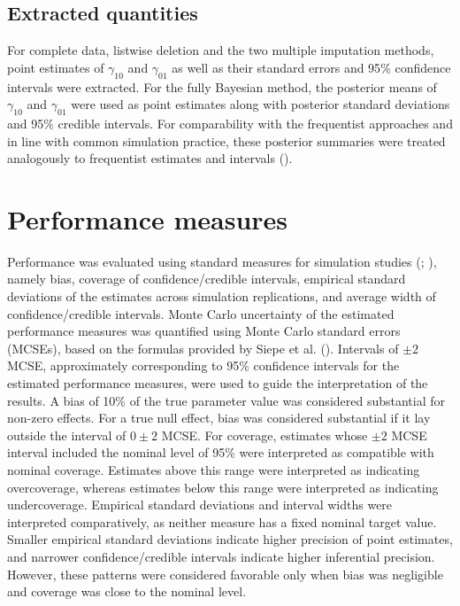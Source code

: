 \documentclass[
  letterpaper,
  11pt,
  english,
  singlespacing,
  headsepline,
  openany]{MastersDoctoralThesis}
\begin{document}
\subsection{Extracted quantities}\label{extracted-quantities}

For complete data, listwise deletion and the two multiple imputation
methods, point estimates of \(\gamma_{10}\) and \(\gamma_{01}\) as well
as their standard errors and 95\(\%\) confidence intervals were
extracted. For the fully Bayesian method, the posterior means of
\(\gamma_{10}\) and \(\gamma_{01}\) were used as point estimates along
with posterior standard deviations and 95\(\%\) credible intervals. For
comparability with the frequentist approaches and in line with common
simulation practice, these posterior summaries were treated analogously
to frequentist estimates and intervals ().

\section{Performance measures}\label{performance-measures}

Performance was evaluated using standard measures for simulation studies
(; ), namely bias, coverage of confidence/credible intervals,
empirical standard deviations of the estimates across simulation
replications, and average width of confidence/credible intervals. Monte
Carlo uncertainty of the estimated performance measures was quantified
using Monte Carlo standard errors (MCSEs), based on the formulas
provided by Siepe et al. (). Intervals of
\(\pm 2\) MCSE, approximately corresponding to 95\% confidence intervals
for the estimated performance measures, were used to guide the
interpretation of the results. A bias of 10\% of the true parameter
value was considered substantial for non-zero effects. For a true null
effect, bias was considered substantial if it lay outside the interval
of \(0 \pm 2\) MCSE. For coverage, estimates whose \(\pm 2\) MCSE
interval included the nominal level of 95\% were interpreted as
compatible with nominal coverage. Estimates above this range were
interpreted as indicating overcoverage, whereas estimates below this
range were interpreted as indicating undercoverage. Empirical standard
deviations and interval widths were interpreted comparatively, as
neither measure has a fixed nominal target value. Smaller empirical
standard deviations indicate higher precision of point estimates, and
narrower confidence/credible intervals indicate higher inferential
precision. However, these patterns were considered favorable only when
bias was negligible and coverage was close to the nominal level.
\end{document}
